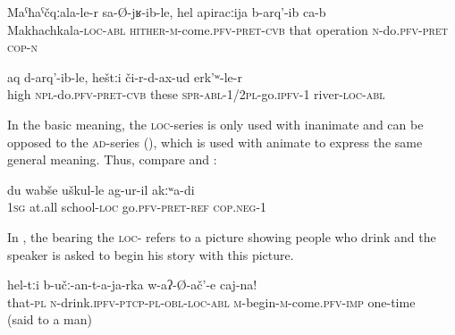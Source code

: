 \begin{exe}
	\ex	\label{ex:He came back from Makhachkala and had the operation}
	\gll	Maˁħaˁčqːala-le-r	sa-Ø-jʁ-ib-le,	hel	apiracːija	b-arq'-ib ca-b\\
		Makhachkala-\textsc{loc}-\textsc{abl}	\textsc{hither-m}-come.\textsc{pfv}-\textsc{pret}-\textsc{cvb} that operation	\textsc{n}-do.\textsc{pfv}-\textsc{pret} \textsc{cop-n}\\
	\glt	{}

	\ex	\label{ex:We take up (the trousers) and go across the river}
	\gll	aq	d-arq'-ib-le,	heštːi	či-r-d-ax-ud	erk'ʷ-le-r\\
		high	\textsc{npl}-do.\textsc{pfv}-\textsc{pret}-\textsc{cvb}	these	\textsc{spr}-\textsc{abl}-1/2\textsc{pl}-go.\textsc{ipfv}-1	river-\textsc{loc}-\textsc{abl}\\
	\glt	{}
\end{exe}


In the basic meaning, the \textsc{loc}-series is only used with inanimate  and can be opposed to the \textsc{ad}-series (), which is used with animate  to express the same general meaning. Thus, compare  and :
%
\begin{exe}
	\ex	\label{ex:I did not go to school at all}
	\gll	du	wabše	uškul-le	ag-ur-il	akːʷa-di \\
		1\textsc{sg}	at.all	school-\textsc{loc}	go.\textsc{pfv}-\textsc{pret}-\textsc{ref}	\textsc{cop.neg}-1\\
	\glt	{}
\end{exe}

In , the  bearing the \textsc{loc-} refers to a picture showing people who drink and the speaker is asked to begin his story with this picture.
%
\begin{exe}
	\ex	\label{ex:First begin with these who drink}
	\gll	hel-tːi	b-učː-an-t-a-ja-rka	w-aʔ-Ø-ač'-e	caj-na! \\
		that-\textsc{pl}	\textsc{n}-drink.\textsc{ipfv}-\textsc{ptcp}-\textsc{pl}-\textsc{obl}-\textsc{loc}-\textsc{abl}	\textsc{m}-begin-\textsc{m}-come.\textsc{pfv}-\textsc{imp} one-time\\
	\glt	{} (said to a man)
\end{exe}

